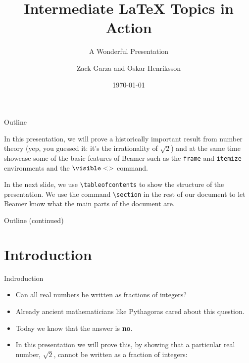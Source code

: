 \documentclass[t]{beamer} %
\title[Intermediate {\LaTeX} Topics]{Intermediate {\LaTeX} Topics in Action}
\subtitle{A Wonderful Presentation}
\author[D. Z. Garza, D. O. Henriksson]{Zack Garza and Oskar Henriksson}
\institute[UCSD]{University of California, San Diego}
\date{\today}
\begin{document}
 
\begin{frame}
\titlepage
\end{frame}

\begin{frame}[fragile]{Outline} %

    In this presentation, we will prove a historically important result from number theory (yep, you guessed it: it's the irrationality of $\sqrt{2}$) and at the same time showcase some of the basic features of Beamer such as the \verb$frame$ and \verb$itemize$ environments and the $\visible<>$ command.
    
    In the next slide, we use \verb$\tableofcontents$ to show the structure of the presentation. We use the command \verb$\section$ in the rest of our document to let Beamer know what the main parts of the document are.

\end{frame}

\begin{frame}{Outline (continued)}

    \tableofcontents[pausesections]
    
\end{frame}

\section{Introduction}

\begin{frame}{Indroduction}

    \begin{itemize}
        \item<2-> Can all real numbers be written as fractions of integers?
        \item<3-> Already ancient mathematicians like Pythagoras cared about this question.
        \item<4-> Today we know that the answer is \textbf{no}.
        \item<5-> In this presentation we will prove this, by showing that a particular real number, $\sqrt{2}$, cannot be written as a fraction of integers:
    \end{itemize}



\end{frame}
\end{document}
